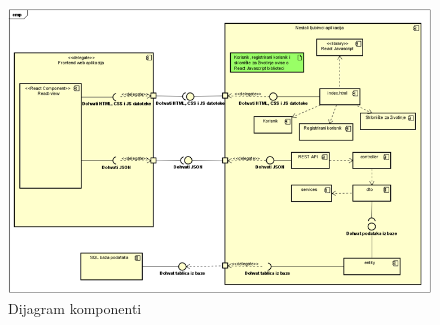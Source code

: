                 \begin{figure}[!htb]
		      \centering
		    \includegraphics[width=\textwidth]{slike/Dijagram_komponenti}
		      \caption{Dijagram komponenti}
		      \end{figure}